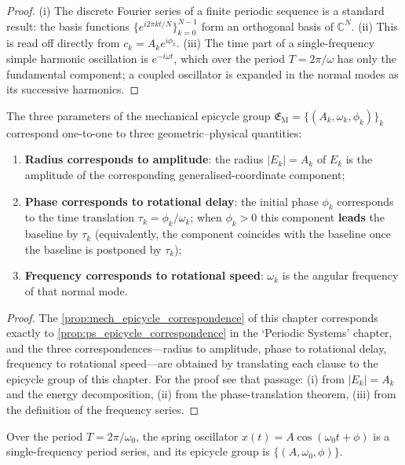 \begin{proof}
(i) The discrete Fourier series of a finite periodic sequence is a standard result: the basis functions $\{e^{i2\pi kt/N}\}_{k=0}^{N-1}$ form an orthogonal basis of $\mathbb C^N$.
(ii) This is read off directly from $c_k=A_k e^{i\phi_k}$.
(iii) The time part of a single-frequency simple harmonic oscillation is $e^{-i\omega t}$, which over the period $T=2\pi/\omega$ has only the fundamental component; a coupled oscillator is expanded in the normal modes as its successive harmonics.
\end{proof}

\begin{proposition}\label{prop:mech_epicycle_correspondence}
The three parameters of the mechanical epicycle group $\mathfrak E_{\mathrm{M}}=\{(A_k,\omega_k,\phi_k)\}_{k}$ correspond one-to-one to three geometric--physical quantities:
\begin{enumerate}[label=(\roman*)]
    \item \textbf{Radius corresponds to amplitude}: the radius $|E_k|=A_k$ of $E_k$ is the amplitude of the corresponding generalised-coordinate component;
    \item \textbf{Phase corresponds to rotational delay}: the initial phase $\phi_k$ corresponds to the time translation $\tau_k=\phi_k/\omega_k$; when $\phi_k>0$ this component \textbf{leads} the baseline by $\tau_k$ (equivalently, the component coincides with the baseline once the baseline is postponed by $\tau_k$);
    \item \textbf{Frequency corresponds to rotational speed}: $\omega_k$ is the angular frequency of that normal mode.
\end{enumerate}
\end{proposition}

\begin{proof}
The \cref{prop:mech_epicycle_correspondence} of this chapter corresponds exactly to \cref{prop:ps_epicycle_correspondence} in the `Periodic Systems' chapter,
and the three correspondences---radius to amplitude, phase to rotational delay, frequency to rotational speed---are obtained by translating each clause to the epicycle group of this chapter.
For the proof see that passage: (i) from $|E_k|=A_k$ and the energy decomposition, (ii) from the phase-translation theorem, (iii) from the definition of the frequency series.
\end{proof}

\begin{example}\label{ex:mech_spring_series}
Over the period $T=2\pi/\omega_0$, the spring oscillator $x(t)=A\cos(\omega_0t+\phi)$ is a single-frequency period series, and its epicycle group is $\{(A,\omega_0,\phi)\}$.
\end{example}

